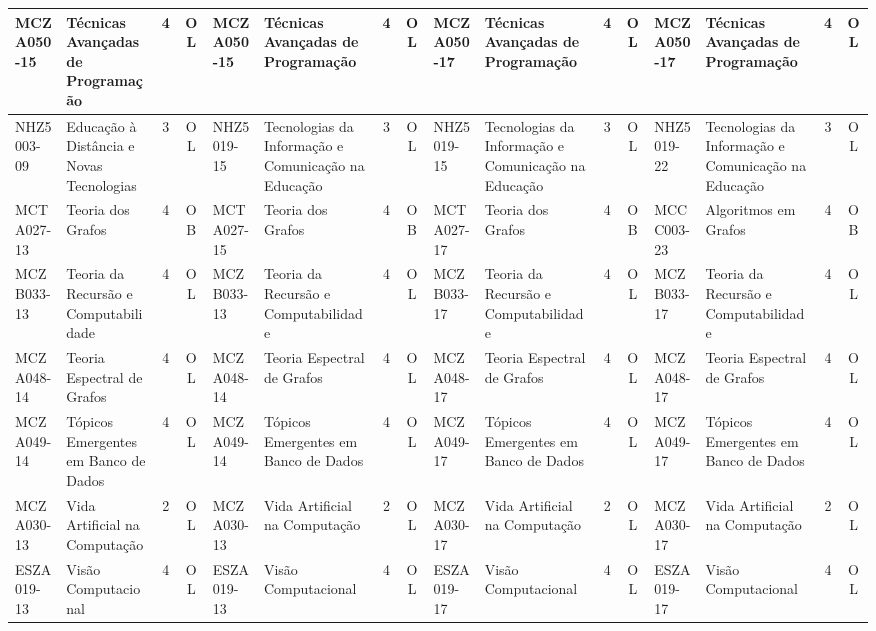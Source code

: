 \documentclass[a4paper]{article}
\begin{document}
\begin{landscape}
{\begin{longtable}{|l|p{.15\textheight}|c|c||l|p{.15\textheight}|c|c||l|p{.15\textheight}|c|c||l|p{.15\textheight}|c|c|}
    MCZA050-15 & Técnicas Avançadas de Programação & 4 & OL &
    MCZA050-15 & Técnicas Avançadas de Programação & 4 & OL &
    MCZA050-17 & Técnicas Avançadas de Programação & 4 & OL &
    MCZA050-17 & Técnicas Avançadas de Programação & 4 & OL \\ \hline

    NHZ5003-09 & Educação à Distância e Novas Tecnologias & 3 & OL &
    NHZ5019-15 & Tecnologias da Informação e Comunicação na Educação & 3 & OL &
    NHZ5019-15 & Tecnologias da Informação e Comunicação na Educação & 3 & OL &
    NHZ5019-22 & Tecnologias da Informação e Comunicação na Educação & 3 & OL \\ \hline

    MCTA027-13 & Teoria dos Grafos & 4 & OB &
    MCTA027-15 & Teoria dos Grafos & 4 & OB &
    MCTA027-17 & Teoria dos Grafos & 4 & OB &
    MCCC003-23 & Algoritmos em Grafos & 4 & OB\\ \hline

    MCZB033-13 & Teoria da Recursão e Computabilidade & 4 & OL &
    MCZB033-13 & Teoria da Recursão e Computabilidade & 4 & OL &
    MCZB033-17 & Teoria da Recursão e Computabilidade & 4 & OL &
    MCZB033-17 & Teoria da Recursão e Computabilidade & 4 & OL \\ \hline

    MCZA048-14 & Teoria Espectral de Grafos & 4 & OL &
    MCZA048-14 & Teoria Espectral de Grafos & 4 & OL &
    MCZA048-17 & Teoria Espectral de Grafos & 4 & OL &
    MCZA048-17 & Teoria Espectral de Grafos & 4 & OL \\ \hline

    MCZA049-14 & Tópicos Emergentes em Banco de Dados & 4 & OL &
    MCZA049-14 & Tópicos Emergentes em Banco de Dados & 4 & OL &
    MCZA049-17 & Tópicos Emergentes em Banco de Dados & 4 & OL &
    MCZA049-17 & Tópicos Emergentes em Banco de Dados & 4 & OL \\ \hline

    MCZA030-13 & Vida Artificial na Computação & 2 & OL &
    MCZA030-13 & Vida Artificial na Computação & 2 & OL &
    MCZA030-17 & Vida Artificial na Computação & 2 & OL &
    MCZA030-17 & Vida Artificial na Computação & 2 & OL \\ \hline

    ESZA019-13 & Visão Computacional & 4 & OL &
    ESZA019-13 & Visão Computacional & 4 & OL &
    ESZA019-17 & Visão Computacional & 4 & OL &
    ESZA019-17 & Visão Computacional & 4 & OL \\ \hline


\end{longtable}}
\end{landscape}
\end{document}
